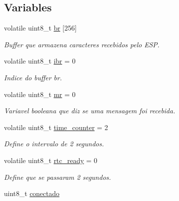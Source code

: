 \subsection*{Variables}
\begin{DoxyCompactItemize}
\item 
\hypertarget{group__main__module_ga6c035063516fb279faa1a09ceebd88fe}{volatile uint8\-\_\-t \hyperlink{group__main__module_ga6c035063516fb279faa1a09ceebd88fe}{br} \mbox{[}256\mbox{]}}\label{group__main__module_ga6c035063516fb279faa1a09ceebd88fe}

\begin{DoxyCompactList}\small\item\em Buffer que armazena caracteres recebidos pelo E\-S\-P. \end{DoxyCompactList}\item 
\hypertarget{group__main__module_gad4efc1423f2a93cf4e6154fb06ce75bc}{volatile uint8\-\_\-t \hyperlink{group__main__module_gad4efc1423f2a93cf4e6154fb06ce75bc}{ibr} = 0}\label{group__main__module_gad4efc1423f2a93cf4e6154fb06ce75bc}

\begin{DoxyCompactList}\small\item\em Indice do buffer br. \end{DoxyCompactList}\item 
\hypertarget{group__main__module_gadba1ad69fadaacdcd17a4e54d682bb50}{volatile uint8\-\_\-t \hyperlink{group__main__module_gadba1ad69fadaacdcd17a4e54d682bb50}{mr} = 0}\label{group__main__module_gadba1ad69fadaacdcd17a4e54d682bb50}

\begin{DoxyCompactList}\small\item\em Variavel booleana que diz se uma mensagem foi recebida. \end{DoxyCompactList}\item 
volatile uint8\-\_\-t \hyperlink{group__main__module_ga31e91be760295a7e79d975c1567f3c80}{time\-\_\-counter} = 2
\begin{DoxyCompactList}\small\item\em Define o intervalo de 2 segundos. \end{DoxyCompactList}\item 
volatile uint8\-\_\-t \hyperlink{group__main__module_ga7633574c3e3924ff2d07ee88bba5a018}{rtc\-\_\-ready} = 0
\begin{DoxyCompactList}\small\item\em Define que se passaram 2 segundos. \end{DoxyCompactList}\item 
\hypertarget{group__main__module_ga71b4bdb5fa7dce6ba0405ed1ea045c77}{uint8\-\_\-t \hyperlink{group__main__module_ga71b4bdb5fa7dce6ba0405ed1ea045c77}{conectado}}\label{group__main__module_ga71b4bdb5fa7dce6ba0405ed1ea045c77}


\end{DoxyCompactItemize}
